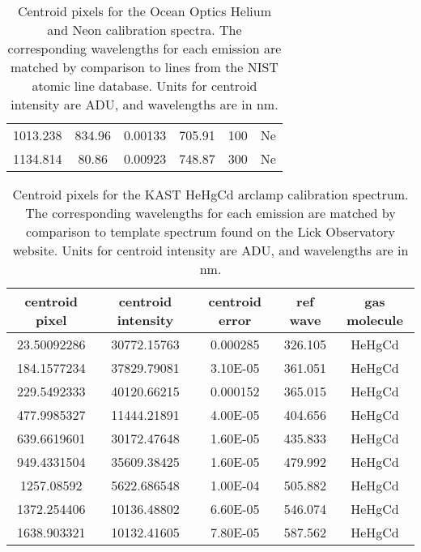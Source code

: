 \documentclass[preprint]{aastex62}
\begin{document}
\begin{table}[H]
\begin{center}
\begin{tabular}{|c|c|c|c|c|c|}
    1013.238    & 834.96          & 0.00133         & 705.91     & 100             & Ne      \\
    1134.814    & 80.86           & 0.00923         & 748.87     & 300             & Ne      \\
    \hline
    \end{tabular}
    \end{center}
\caption{Centroid pixels for the Ocean Optics Helium and Neon calibration spectra. The corresponding wavelengths for each emission are matched by comparison to lines from the NIST atomic line database. Units for centroid intensity are ADU, and wavelengths are in nm.} \label{table:oceanlab_centroids}
\end{table}

\begin{table}[H]
    \begin{center}
    \begin{tabular}{|c|c|c|c|c|}
    \hline
    centroid pixel & centroid intensity & centroid error & ref wave & gas molecule \\
    \hline \hline
    23.50092286 & 30772.15763     & 0.000285       & 326.105   & HeHgCd \\
    184.1577234 & 37829.79081     & 3.10E-05       & 361.051   & HeHgCd \\
    229.5492333 & 40120.66215     & 0.000152       & 365.015   & HeHgCd \\
    477.9985327 & 11444.21891     & 4.00E-05       & 404.656   & HeHgCd \\
    639.6619601 & 30172.47648     & 1.60E-05       & 435.833   & HeHgCd \\
    949.4331504 & 35609.38425     & 1.60E-05       & 479.992   & HeHgCd \\
    1257.08592  & 5622.686548     & 1.00E-04       & 505.882   & HeHgCd \\
    1372.254406 & 10136.48802     & 6.60E-05       & 546.074   & HeHgCd \\
    1638.903321 & 10132.41605     & 7.80E-05       & 587.562   & HeHgCd \\
    \hline
    \end{tabular}
    \end{center}
\caption{Centroid pixels for the KAST HeHgCd arclamp calibration spectrum. The corresponding wavelengths for each emission are matched by comparison to template spectrum found on the Lick Observatory website. Units for centroid intensity are ADU, and wavelengths are in nm.} \label{table:kast_centroids}
\end{table}
\end{document}
